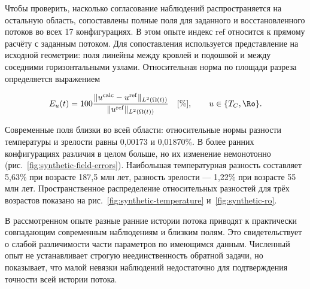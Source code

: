 
Чтобы проверить, насколько согласование наблюдений распространяется
на остальную область, сопоставлены полные поля для заданного
и восстановленного потоков во всех 17 конфигурациях.
В этом опыте индекс $\mathrm{ref}$ относится к прямому расчёту
с заданным потоком. Для сопоставления используется представление
на исходной геометрии: поля линейны между кровлей и подошвой
и между соседними горизонтальными узлами.
Относительная норма по площади разреза определяется выражением

\begin{equation}
 E_u(t)=100\frac{\|u^{\mathrm{calc}}-u^{\mathrm{ref}}\|_{L^2(\Omega(t))}}
                    {\|u^{\mathrm{ref}}\|_{L^2(\Omega(t))}}\quad[\%],
 \qquad u\in\{T_C,\Ro\}.
\end{equation}

Современные поля близки во всей области: относительные нормы
разности температуры и зрелости равны 0,00173 и 0,01870\%.
В более ранних конфигурациях различия в целом больше,
но их изменение немонотонно (рис.~\ref{fig:synthetic-field-errors}).
Наибольшая температурная разность составляет 5,63\%
при возрасте 187,5 млн лет, разность зрелости --- 1,22\%
при возрасте 55 млн лет. Пространственное распределение
относительных разностей для трёх возрастов показано
на рис.~\ref{fig:synthetic-temperature} и~\ref{fig:synthetic-ro}.

В рассмотренном опыте разные ранние истории потока приводят
к практически совпадающим современным наблюдениям и близким полям.
Это свидетельствует о слабой различимости части параметров
по имеющимся данным. Численный опыт не устанавливает строгую
неединственность обратной задачи, но показывает, что малой невязки
наблюдений недостаточно для подтверждения точности всей истории потока.

